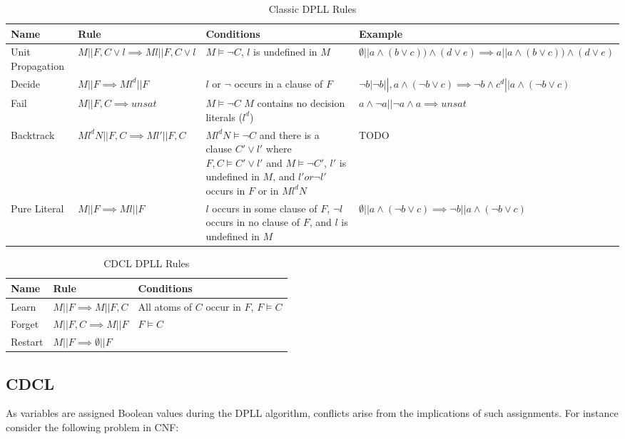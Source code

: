 \documentclass[]{final_report}
\begin{document}
\begin{table}[t]
\begin{tabular}{|p{2cm}|p{4cm}|p{4cm}|p{4cm}|}
\hline
Name & Rule & Conditions & Example \\ \hline
Unit Propagation & $M|| F, C \lor l \implies M l || F, C \lor l$ & ​$M \models \lnot C $, $l$ is undefined in $M$ & $\emptyset || a \land (b \lor c) ) \land (d \lor e) \implies a || a \land (b \lor c) ) \land (d \lor e) $ \\ \hline
Decide & $M|| F \implies M l^d || F$ & $l$ or $\lnot$ occurs in a clause of $F$ & $ \lnot b | \lnot b ||, a \land (\lnot b \lor c) \implies\lnot b \land c^d ||a \land (\lnot b \lor c) $ \\ \hline
Fail & $M|| F, C \implies unsat$ & $M \models \lnot C$ $M$ contains no decision literals ($l^d$) & $ a \land \lnot a || \lnot a \land a \implies unsat $ \\ \hline
Backtrack & $M l^d N|| F, C \implies M l' || F, C$ & $M l^d N \models \lnot C$ and there is a clause $C' \lor l'$ where $F, C \models C' \lor l'$ and $M \models \lnot C'$, $l'$ is undefined in $M$, and $l' or \lnot l'$ occurs in $F$ or in $M l^d N$ & TODO \\ \hline
Pure Literal & $M|| F \implies Ml || F$ & $l$ occurs in some clause of $F$, $\lnot l$ occurs in no clause of $F$, and $l$ is undefined in $M$ & $\emptyset || a \land (\lnot b \lor c) \implies \lnot b || a \land (\lnot b \lor c) $ \\ \hline
\end{tabular}
\caption{Classic DPLL Rules}
\label{table:classic-dpll-rules}
\end{table}


\begin{table}[t]
\centering
\begin{tabular}{|p{2cm}|p{5.5cm}|p{5.5cm}}
\hline
Name & Rule & Conditions  \\ \hline
Learn & $M|| F \implies M || F, C$ & All atoms of $C$ occur in $F$, $F \models C$  \\ \hline
Forget & $M|| F, C \implies M || F $ & $F \models C$  \\ \hline
Restart & $M|| F \implies \emptyset || F$ &  \\ \hline
\end{tabular}
\caption{CDCL DPLL Rules}
\label{table:cdcl-rules}
\end{table}

\subsection{CDCL}
As variables are assigned Boolean values during the DPLL algorithm, conflicts arise from the implications of such assignments. For instance consider the following problem in CNF:
\end{document}
